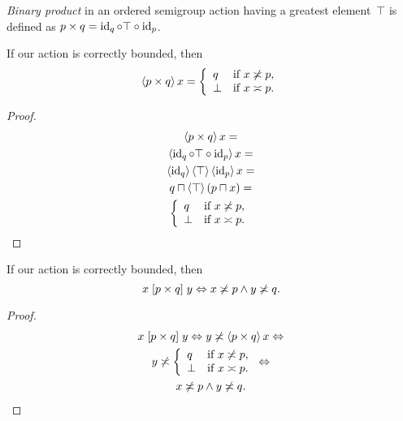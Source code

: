 \emph{Binary product} in an ordered semigroup action having a greatest element~$\top$ is defined as $p\times q=\operatorname{id}_q\circ\top\circ\operatorname{id}_p$.

\begin{thm}
If our action is correctly bounded, then
\[
\left\langle p\times q\right\rangle x =
\left\{\begin{array}{ll}q&\text{if }x\not\asymp p,\\\bot&\text{if }x\asymp p.\end{array}\right.
\]
\end{thm}

\begin{proof}
\begin{multline*}
\left\langle p\times q\right\rangle x = \\
\left\langle \operatorname{id}_q\circ\top\circ\operatorname{id}_p\right\rangle x = \\
\left\langle \operatorname{id}_q\right\rangle\left\langle \top\right\rangle\left\langle \operatorname{id}_p\right\rangle x = \\
q\sqcap\left\langle \top\right\rangle(p\sqcap x) = \\
\left\{\begin{array}{ll}q&\text{if }x\not\asymp p,\\\bot&\text{if }x\asymp p.\end{array}\right.
\end{multline*}
\end{proof}

% 
% 

\begin{thm}
If our action is correctly bounded, then
\[ x\mathrel{\left[p\times q\right]}y\Leftrightarrow x\not\asymp p\land y\not\asymp q. \]
\end{thm}

\begin{proof}
\begin{multline*}
x\mathrel{\left[p\times q\right]}y \Leftrightarrow
y\not\asymp\left\langle p\times q\right\rangle x \Leftrightarrow \\
y\not\asymp
\left\{\begin{array}{ll}q&\text{if }x\not\asymp p,\\\bot&\text{if }x\asymp p.\end{array}\right. \Leftrightarrow \\
x\not\asymp p\land y\not\asymp q.
\end{multline*}
\end{proof}

